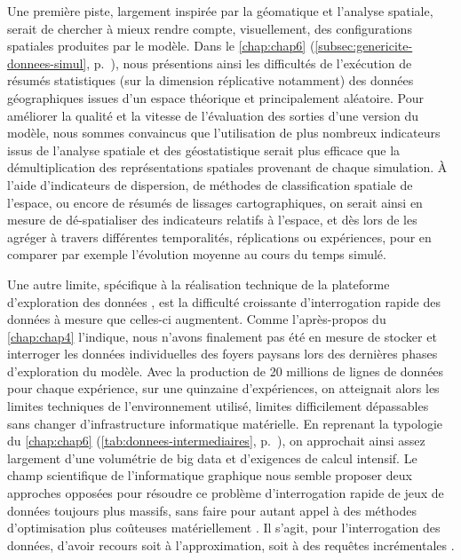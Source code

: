 Une première piste, largement inspirée par la géomatique et l'analyse spatiale, serait de chercher à mieux rendre compte, visuellement, des configurations spatiales produites par le modèle.
Dans le \cref{chap:chap6} (\cref{subsec:genericite-donnees-simul}, p.~\pageref{par:specificites-donnees-simul}), nous présentions ainsi les difficultés de l'exécution de \og résumés statistiques\fg{} (sur la dimension réplicative notamment) des données géographiques issues d'un espace théorique et principalement aléatoire.
Pour améliorer la qualité et la vitesse de l'évaluation des sorties d'une version du modèle, nous sommes convaincus que l'utilisation de plus nombreux indicateurs issus de l'analyse spatiale et des géostatistique serait plus efficace que la démultiplication des représentations spatiales provenant de chaque simulation.
À l'aide d'indicateurs de dispersion, de méthodes de classification spatiale de l'espace, ou encore de résumés de lissages cartographiques, on serait ainsi en mesure de \og dé-spatialiser\fg{} des indicateurs relatifs à l'espace, et dès lors de les agréger à travers différentes temporalités, réplications ou expériences, pour en comparer par exemple l'évolution moyenne au cours du temps simulé.

Une autre limite, spécifique à la réalisation technique de la plateforme d'exploration des données \simedb{}, est la difficulté croissante d'interrogation rapide des données à mesure que celles-ci augmentent.
Comme l'après-propos du \cref{chap:chap4} l'indique, nous n'avons finalement pas été en mesure de stocker et interroger les données individuelles des foyers paysans lors des dernières phases d'exploration du modèle.
Avec la production de 20 millions de lignes de données pour chaque expérience, sur une quinzaine d'expériences, on atteignait alors les limites techniques de l'environnement utilisé, limites difficilement dépassables sans changer d'infrastructure informatique matérielle.
En reprenant la typologie du \cref{chap:chap6} (\cref{tab:donnees-intermediaires}, p.~\pageref{tab:donnees-intermediaires}), on approchait ainsi assez largement d'une volumétrie de big data et d'exigences de calcul intensif.
Le champ scientifique de l'informatique graphique nous semble proposer deux approches opposées pour résoudre ce problème d'interrogation rapide de jeux de données toujours plus massifs, sans faire pour autant appel à des méthodes d'optimisation plus coûteuses matériellement \autocite{amirpour_amraii_human-data_2018}.
Il s'agit, pour l'interrogation des données, d'avoir recours soit à l'approximation, soit à des requêtes incrémentales \autocite[28--33]{amirpour_amraii_human-data_2018}.

